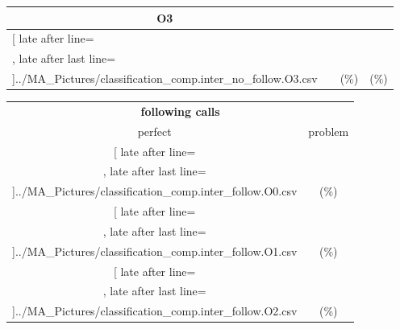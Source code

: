 \begin{table}[!htbp]
{\begin{tabular}{l|c|c|c}
\multicolumn{1}{c}{\bfseries O3}
	\\\midrule
	\csvreader[ late after line=\\, late after last line=\\\bottomrule]{../MA_Pictures/classification_comp.inter_no_follow.O3.csv}{
}
	{\csvcolii  &  \csvcoliii & \csvcoliv (\csvcolv \%) & \csvcolvi (\csvcolvii\%)}%


    	\end{tabular}

	\begin{tabular}{|c|c}%

	\toprule
    \multicolumn{2}{c}{\bfseries following calls}\\
	
	     perfect &  problem %
	\\\midrule
	\csvreader[ late after line=\\, late after last line=\\\midrule]{../MA_Pictures/classification_comp.inter_follow.O0.csv}{
}
	{\csvcoliv (\csvcolv \%) & \csvcolvi (\csvcolvii\%)}%
\multicolumn{1}{c}{}

	\\\midrule
	\csvreader[ late after line=\\, late after last line=\\\midrule]{../MA_Pictures/classification_comp.inter_follow.O1.csv}{
}
	{\csvcoliv (\csvcolv \%) & \csvcolvi (\csvcolvii\%)}%
	
	\multicolumn{1}{c}{}

	\\\midrule
	\csvreader[ late after line=\\, late after last line=\\\midrule]{../MA_Pictures/classification_comp.inter_follow.O2.csv}{
}
	{\csvcoliv (\csvcolv \%) & \csvcolvi (\csvcolvii\%)}%
	

\end{tabular}}
\end{table}
